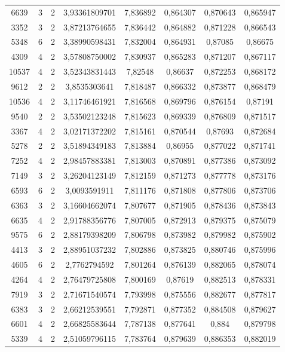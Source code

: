 \begin{longtable}{|c|c|c|c|c|c|c|c|}
6639 & 3 & 2 & 3,93361809701 & 7,836892 & 0,864307 & 0,870643 & 0,865947 \\
3352 & 3 & 2 & 3,87213764655 & 7,836442 & 0,864882 & 0,871228 & 0,866543 \\
5348 & 6 & 2 & 3,38990598431 & 7,832004 & 0,864931 & 0,87085 & 0,86675 \\
4309 & 4 & 2 & 3,57808750002 & 7,830937 & 0,865283 & 0,871207 & 0,867117 \\
10537 & 4 & 2 & 3,52343831443 & 7,82548 & 0,86637 & 0,872253 & 0,868172 \\
9612 & 2 & 2 & 3,8535303641 & 7,818487 & 0,866332 & 0,873877 & 0,868479 \\
10536 & 4 & 2 & 3,11746461921 & 7,816568 & 0,869796 & 0,876154 & 0,87191 \\
9540 & 2 & 2 & 3,53502123248 & 7,815623 & 0,869339 & 0,876809 & 0,871517 \\
3367 & 4 & 2 & 3,02171372202 & 7,815161 & 0,870544 & 0,87693 & 0,872684 \\
5278 & 2 & 2 & 3,51894349183 & 7,813884 & 0,86955 & 0,877022 & 0,871741 \\
7252 & 4 & 2 & 2,98457883381 & 7,813003 & 0,870891 & 0,877386 & 0,873092 \\
7149 & 3 & 2 & 3,26204123149 & 7,812159 & 0,871273 & 0,877778 & 0,873176 \\
6593 & 6 & 2 & 3,0093591911 & 7,811176 & 0,871808 & 0,877806 & 0,873706 \\
6363 & 3 & 2 & 3,16604662074 & 7,807677 & 0,871905 & 0,878436 & 0,873843 \\
6635 & 4 & 2 & 2,91788356776 & 7,807005 & 0,872913 & 0,879375 & 0,875079 \\
9575 & 6 & 2 & 2,88179398209 & 7,806798 & 0,873982 & 0,879982 & 0,875902 \\
4413 & 3 & 2 & 2,88951037232 & 7,802886 & 0,873825 & 0,880746 & 0,875996 \\
4605 & 6 & 2 & 2,7762794592 & 7,801264 & 0,876139 & 0,882065 & 0,878074 \\
4264 & 4 & 2 & 2,76479725808 & 7,800169 & 0,87619 & 0,882513 & 0,878331 \\
7919 & 3 & 2 & 2,71671540574 & 7,793998 & 0,875556 & 0,882677 & 0,877817 \\
6383 & 3 & 2 & 2,66212539551 & 7,792871 & 0,877352 & 0,884508 & 0,879627 \\
6601 & 4 & 2 & 2,66825583644 & 7,787138 & 0,877641 & 0,884 & 0,879798 \\
5339 & 4 & 2 & 2,51059796115 & 7,783764 & 0,879639 & 0,886353 & 0,882019 \\

\end{longtable}
